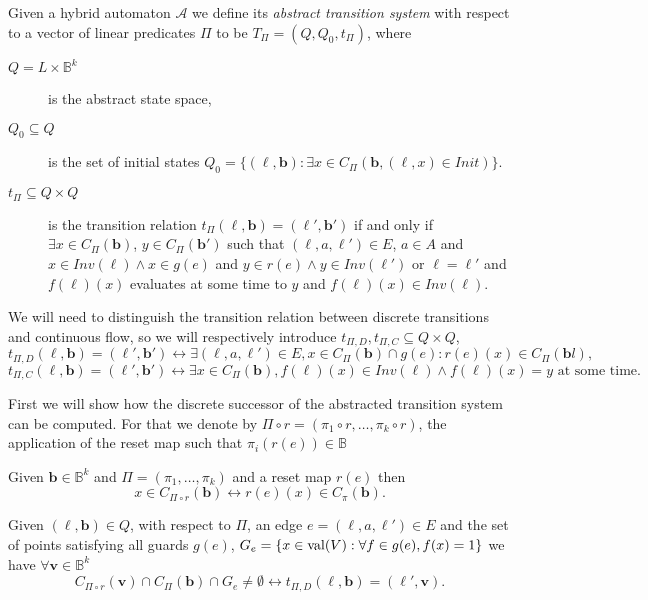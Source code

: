  \begin{defi}
Given a hybrid automaton $\mathcal{A}$ we define its \emph{abstract transition system} with respect to a vector of linear predicates $\Pi$ to be $T_{\Pi}=(Q,Q_{0},t_{\Pi})$, where
\begin{description}
\item[$Q=L\times\mathbb{B}^{k}$]{is the abstract state space,}
\item[$Q_{0}\subseteq Q$]{is the set of initial states $Q_{0}=\{(\ell,\mathbf{b}): \exists x\in C_{\Pi}(\mathbf{b}, (\ell,x)\in Init)\}$.}
\item[$t_{\Pi}\subseteq Q\times Q$]{is the transition relation
    $t_{\Pi}(\ell,\mathbf{b})=(\ell',\mathbf{b}')$ if and only if
    $\exists x \in C_{\Pi}(\mathbf{b})$, $y\in C_{\Pi}(\mathbf{b}')$ such that $(\ell,a,\ell')\in E$, $a\in A$ and $x\in Inv(\ell) \land x\in g(e)$ and
    $y\in r(e) \land y\in Inv(\ell')$ or $\ell=\ell'$ and $f(\ell)(x)$ evaluates at some time to $y$ and $f(\ell)(x)\in Inv(\ell)$.}
\end{description}
\end{defi}
We will need to distinguish the transition relation between discrete transitions and continuous flow, so we will respectively introduce $t_{\Pi,D}, t_{\Pi,C}\subseteq Q\times Q$,
\[
t_{\Pi,D}(\ell,\mathbf{b})=(\ell',\mathbf{b}') \leftrightarrow \exists(\ell,a,\ell')\in E, x\in C_{\Pi}(\mathbf{b})\cap g(e) : r(e)(x) \in C_{\Pi}(\mathbf{b}l),
\]
\[
t_{\Pi,C}(\ell,\mathbf{b})=(\ell',\mathbf{b}') \leftrightarrow \exists x \in C_{\Pi}(\mathbf{b}), f(\ell)(x)\in Inv(\ell) \land f(\ell)(x) = y \text{ at some time}.
\]

First we will show how the discrete successor of the abstracted transition system can be computed. For that we denote by $\Pi\circ r = (\pi_{1}\circ r, \ldots, \pi_{k}\circ r)$, the application of the reset map such that $\pi_{i}(r(e))\in\mathbb{B}$

\begin{lem}
Given $\mathbf{b}\in\mathbb{B}^{k}$ and $\Pi=(\pi_{1},\ldots,\pi_{k})$ and a reset map $r(e)$ then
\[
x\in C_{\Pi\circ r}(\mathbf{b}) \leftrightarrow r(e)(x)\in C_{\pi}(\mathbf{b}).
\]
\end{lem}

\begin{thm}
Given $(\ell,\mathbf{b})\in Q$, with respect to $\Pi$, an edge $e=(\ell,a,\ell')\in E$ and the set of points satisfying all guards $g(e)$,
$G_{e}=\{x\in\operatorname{val}(V) : \forall f\in g(e), f(x)=1\}$ we have
$\forall \mathbf{v}\in\mathbb{B}^{k}$
\[
C_{\Pi\circ r}(\mathbf{v})\cap C_{\Pi}(\mathbf{b})\cap G_{e} \neq \emptyset \leftrightarrow t_{\Pi,D}(\ell,\mathbf{b}) = (\ell',\mathbf{v}).
\]
\end{thm}

